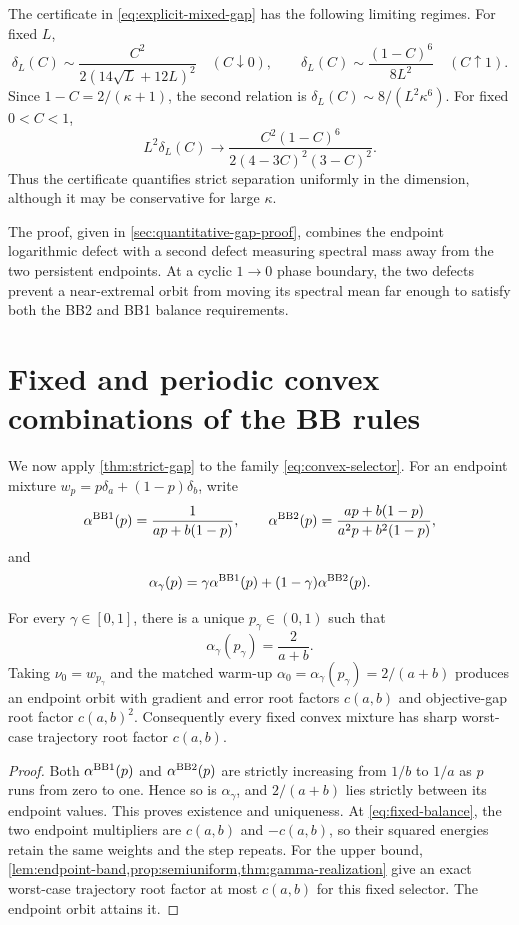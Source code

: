 \documentclass[letterpaper,twoside]{article}
\begin{document}
\begin{remark}
The certificate in \eqref{eq:explicit-mixed-gap} has the following limiting
regimes.  For fixed $L$,
\[
 \delta_L(C)\sim\frac{C^2}{2(14\sqrt L+12L)^2}\quad(C\downarrow0),
 \qquad
 \delta_L(C)\sim\frac{(1-C)^6}{8L^2}\quad(C\uparrow1).
\]
Since $1-C=2/(\kappa+1)$, the second relation is
$\delta_L(C)\sim8/(L^2\kappa^6)$.  For fixed $0<C<1$,
\[
 L^2\delta_L(C)\longrightarrow
 \frac{C^2(1-C)^6}{2(4-3C)^2(3-C)^2}.
\]
Thus the certificate quantifies strict separation uniformly in the dimension,
although it may be conservative for large $\kappa$.
\end{remark}

The proof, given in \cref{sec:quantitative-gap-proof}, combines the endpoint
logarithmic defect with a second defect measuring spectral mass away from the
two persistent endpoints.  At a cyclic $1\to0$ phase boundary, the two
defects prevent a near-extremal orbit from moving its spectral mean far
enough to satisfy both the BB2 and BB1 balance requirements.

\section{Fixed and periodic convex combinations of the BB rules}\label{sec:convex}

We now apply \cref{thm:strict-gap} to the family
\eqref{eq:convex-selector}.  For an endpoint mixture
$w_p=p\delta_a+(1-p)\delta_b$, write
\[
 \alpha^{\rm BB1}(p)=\frac1{ap+b(1-p)},
 \qquad
 \alpha^{\rm BB2}(p)=\frac{ap+b(1-p)}{a^2p+b^2(1-p)},
\]
and
\[
 \alpha_\gamma(p)=\gamma\alpha^{\rm BB1}(p)
 +(1-\gamma)\alpha^{\rm BB2}(p).
\]

\begin{proposition}\label{prop:fixed-mixture}
For every $\gamma\in[0,1]$, there is a unique
$p_\gamma\in(0,1)$ such that
\begin{equation}\label{eq:fixed-balance}
 \alpha_\gamma(p_\gamma)=\frac2{a+b}.
\end{equation}
Taking $\nu_0=w_{p_\gamma}$ and the matched warm-up
$\alpha_0=\alpha_\gamma(p_\gamma)=2/(a+b)$ produces an endpoint orbit
with gradient and error root factors $c(a,b)$ and objective-gap root factor
$c(a,b)^2$.  Consequently every fixed convex mixture has sharp worst-case
trajectory root factor
$c(a,b)$.
\end{proposition}

\begin{proof}
Both $\alpha^{\rm BB1}(p)$ and $\alpha^{\rm BB2}(p)$ are strictly increasing
from $1/b$ to $1/a$ as $p$ runs from zero to one.  Hence so is
$\alpha_\gamma$, and
$2/(a+b)$ lies strictly between its endpoint values.  This proves existence
and uniqueness.  At \eqref{eq:fixed-balance}, the two endpoint multipliers
are $c(a,b)$ and $-c(a,b)$, so their squared energies retain the same weights
and the step repeats.  For the upper bound,
\cref{lem:endpoint-band,prop:semiuniform,thm:gamma-realization} give an exact
worst-case trajectory root factor at most $c(a,b)$ for this fixed selector.  The
endpoint orbit attains it.
\end{proof}
\end{document}
